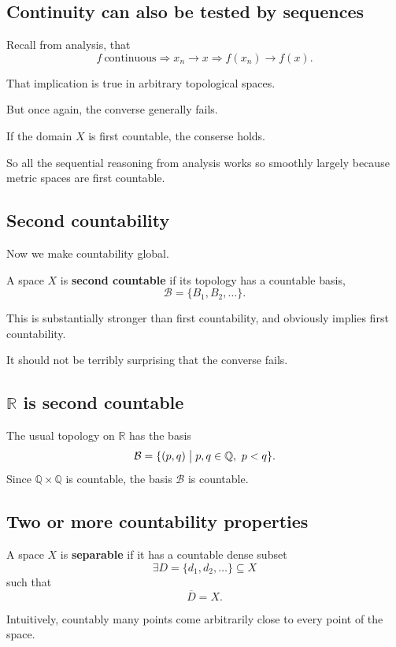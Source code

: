 \documentclass[11pt]{article}
\begin{document}
\subsection{Continuity can also be tested by sequences}

Recall from analysis, that 
\[
    f \ \text{continuous} \Rightarrow x_n \to x \Rightarrow 
    f(x_n) \to f(x). 
\]

That implication is true in arbitrary topological spaces. 

But once again, the converse generally fails. 

If the domain $X$ is first countable, the conserse holds. 

So all the sequential reasoning from analysis works 
so smoothly largely because metric spaces are first 
countable. 

\subsection{Second countability}

Now we make countability global. 

A space $X$ is \textbf{second countable} if 
its topology has a countable basis, 
\[
    \mathcal B = \{B_1, B_2,\ldots\}. 
\]

This is substantially stronger than first countability, 
and obviously implies first countability. 

It should not be terribly surprising that the 
converse fails. 

\subsection{$\mathbb R$ is second countable}

The usual topology on $\mathbb R$ has the basis 
\[
    \mathcal B = \{(p,q) \bigm| p,q\in \mathbb Q, \ p < q\}. 
\]
Since $\mathbb Q \times \mathbb Q$ is countable, 
the basis $\mathcal B$ is countable. 

\subsection{Two or more countability properties} 

A space $X$ is \textbf{separable} if it has a 
countable dense subset 
\[
    \exists D = \{d_1,d_2,\ldots\} \subseteq X 
\]
such that 
\[
    \overline D = X. 
\]

Intuitively, countably many points 
come arbitrarily close to every point of the 
space. 
\end{document}
